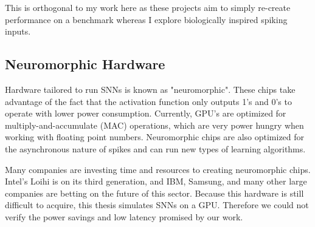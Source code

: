\documentclass[../taasin.tex]{subfiles}
\begin{document}
This is orthogonal to my work here as these projects aim to simply re-create performance on a benchmark whereas I explore biologically inspired spiking inputs. 


\subsection{Neuromorphic Hardware}

Hardware tailored to run SNNs is known as "neuromorphic". These chips take advantage of the fact that the activation function only outputs 1's and 0's to operate with lower power consumption. Currently, GPU's are optimized for multiply-and-accumulate (MAC) operations, which are very power hungry when working with floating point numbers. Neuromorphic chips are also optimized for the asynchronous nature of spikes and can run new types of learning algorithms. 

Many companies are investing time and resources to creating neuromorphic chips. Intel's Loihi \cite{8259423} is on its third generation, and IBM, Samsung, and many other large companies are betting on the future of this sector. Because this hardware is still difficult to acquire, this thesis simulates SNNs on a GPU. Therefore we could not verify the power savings and low latency promised by our work.
\end{document}
